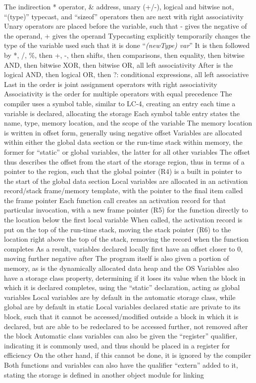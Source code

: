 \documentclass[11 pt, twoside]{article}
\newenvironment{outline*}
{
	\begin{outline}[enumerate]
	}
	{\end{outline}
}
\begin{document}
\begin{outline*}
\3 The indirection * operator, \& address, unary (+/-), logical and bitwise not, ``(type)'' typecast, and ``sizeof'' operators then are next with right associativity
\4 Unary operators are placed before the variable, such that - gives the negative of the operand, + gives the operand
\4 Typecasting explicitly temporarily changes the type of the variable used such that it is done ``\textit{(newType) var}''
\3 It is then followed by *, /, \%, then +, -, then shifts, then comparisons, then equality, then bitwise AND, then bitwise XOR, then bitwise OR, all left associativity
\3 After is the logical AND, then logical OR, then ?: conditional expressions, all left associative
\3 Last in the order is joint assignment operators with right associativity
\3 Associativity is the order for multiple operators with equal precedence
\1 The compiler uses a symbol table, similar to LC-4, creating an entry each time a variable is declared, allocating the storage
\2 Each symbol table entry states the name, type, memory location, and the scope of the variable
\3 The memory location is written in offset form, generally using negative offset
\2 Variables are allocated within either the global data section or the run-time stack within memory, the former for ``static'' or global variables, the latter for all other variables
\3 The offset thus describes the offset from the start of the storage region, thus in terms of a pointer to the region, such that the global pointer (R4) is a built in pointer to the start of the global data section
\3 Local variables are allocated in an activation record/stack frame/memory template, with the pointer to the final item called the frame pointer
\4 Each function call creates an activation record for that particular invocation, with a new frame pointer (R5) for the function directly to the location below the first local variable
\4 When called, the activation record is put on the top of the run-time stack, moving the stack pointer (R6) to the location right above the top of the stack, removing the record when the function completes
\4 As a result, variables declared locally first have an offset closer to 0, moving further negative after
\3 The program itself is also given a portion of memory, as is the dynamically allocated data heap and the OS
\1 Variables also have a storage class property, determining if it loses its value when the block in which it is declared completes, using the ``static'' declaration, acting as global variables
\2 Local variables are by default in the automatic storage class, while global are by default in static
\2 Local variables declared static are private to its block, such that it cannot be accessed/modified outside a block in which it is declared, but are able to be redeclared to be accessed further, not removed after the block
\2 Automatic class variables can also be given the ``register'' qualifier, indicating it is commonly used, and thus should be placed in a register for efficiency
\3 On the other hand, if this cannot be done, it is ignored by the compiler
\2 Both functions and variables can also have the qualifier ``extern'' added to it, stating the storage is defined in another object module for linking
\end{outline*}
\end{document}
